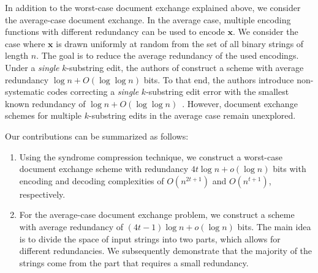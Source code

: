 \documentclass[onecolumn]{IEEEtran}
\newcommand{\bl}{n}
\newcommand{\numedits}{t}
\newcommand{\bfx}{{\mathbf{ x}}}
\begin{document}


In addition to the worst-case document exchange explained above, we consider the average-case document exchange. In the average case, multiple encoding functions with different redundancy can be used to encode $\mathbf{x}$. We consider the case where $\bfx$ is drawn uniformly at random from the set of all binary strings of length $n$. The goal is to reduce the average redundancy of the used encodings. Under a \emph{single} $k$-substring edit, the authors of \cite{Li_Optimal_one_substring_error} construct a scheme with average redundancy $\log\bl + O(\log\log\bl)$ bits. To that end, the authors introduce non-systematic codes correcting a \emph{single} $k$-substring edit error with the smallest known redundancy of $\log\bl + O(\log\log\bl)$~\cite{Li_Optimal_one_substring_error}. However, document exchange schemes for multiple $k$-substring edits in the average case remain unexplored. 

  

Our contributions can be summarized as follows: \begin{enumerate}[label={\emph{(\Roman*)}}]
    \item Using the syndrome compression technique, we construct a worst-case document exchange scheme with redundancy $4\numedits\log\bl + o(\log\bl)$ bits with encoding and decoding complexities of $O(n^{2t+1})$ and  $O(n^{t+1})$, respectively. 
    
    \item For the average-case document exchange problem,  %
    we construct a scheme with average redundancy of $(4\numedits-1)\log\bl + o(\log\bl)$ bits. The main idea is to divide the space of input strings into two parts, which allows for different redundancies. We subsequently demonstrate that the majority of the strings come from the part that requires a small redundancy.
\end{enumerate}
\end{document}
